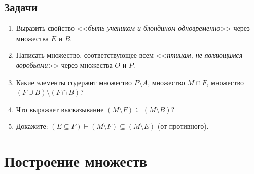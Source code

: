 \subsection*{Задачи}
\begin{enumerate}
\item Выразить свойство <<\textit{быть учеником и блондином одновременно}>> через множества $E$ и $B$.
\item Написать множество, соответствующее всем <<\textit{птицам, не являющимся воробьями}>> через множества $O$ и $P$.
\item Какие элементы содержит множество $P\setminus A$, множество $M\cap F$, множество $(F\cup B)\setminus (F\cap B)$?
\item Что выражает высказывание $(M\setminus F)\subseteq (M\setminus B)$?
\item Докажите: $(E\subseteq F)\vdash (M\setminus F)\subseteq (M\setminus E)$ (от противного).
\end{enumerate}


\section{Построение множеств}

